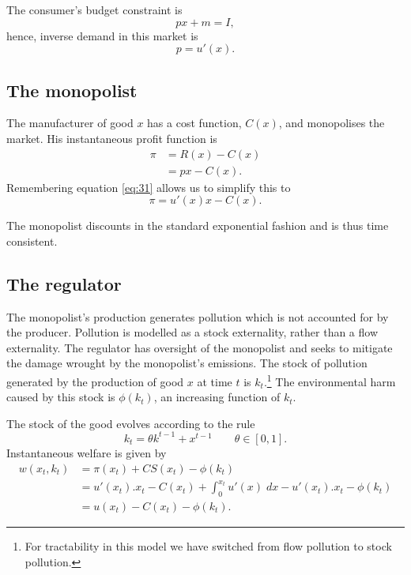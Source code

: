 The consumer's budget constraint is
\begin{equation}
  \label{eq:28} p x + m = I,
\end{equation} hence, inverse demand in this market is
\begin{equation}
  \label{eq:31}
  p=u'(x).
\end{equation}

\subsection{The monopolist}
\label{sec:monopolist}

The manufacturer of good $x$ has a cost function, $C(x)$, and
monopolises the market. His instantaneous profit function is
\begin{align}
  \label{eq:32}\pi &= R(x) - C(x) \\
  &= px - C(x).
\end{align}
Remembering equation \eqref{eq:31} allows us to simplify this to
\begin{equation}
  \label{eq:81}
  \pi = u'(x)x - C(x).
\end{equation}

The monopolist discounts in the standard exponential fashion and is
thus time consistent.

\subsection{The regulator}
\label{sec:regulator}

The monopolist's production generates pollution which is not accounted
for by the producer. Pollution is modelled as a stock externality,
rather than a flow externality. The regulator has oversight of the
monopolist and seeks to mitigate the damage wrought by the
monopolist's emissions.  The stock of pollution generated by the
production of good $x$ at time $t$ is $k_t$.\footnote{For tractability
  in this model we have switched from flow pollution to stock
  pollution.} The environmental harm caused by this stock is
$\phi(k_t)$, an increasing function of $k_t$.

The stock of the good evolves according to the rule
\begin{equation}
  \label{eq:33} k_t = \theta k^{t-1} + x^{t-1} \qquad \theta \in [0,1].
\end{equation} Instantaneous welfare is given by
\begin{align}
  \label{eq:34}w(x_t,k_t) &= \pi(x_t) + CS(x_t) - \phi(k_t) \\
  &=  u'(x_t).x_t - C(x_t) + \int_0^{x_t} u'(x)\; dx - u'(x_t).x_t -
  \phi(k_t) \\ \label{eq:83}
  &= u(x_t) - C(x_t) - \phi(k_t).
\end{align}

